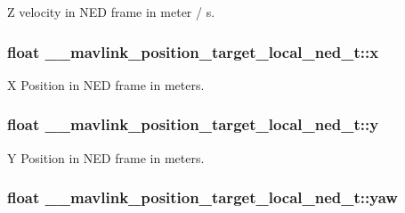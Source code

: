 Z velocity in N\+E\+D frame in meter / s. 

\hypertarget{struct____mavlink__position__target__local__ned__t_acd9e375486fbe3886526fa88fcb47c7c}{
\subsubsection[{x}]{\setlength{\rightskip}{0pt plus 5cm}float \+\_\+\+\_\+mavlink\+\_\+position\+\_\+target\+\_\+local\+\_\+ned\+\_\+t\+::x}}\label{struct____mavlink__position__target__local__ned__t_acd9e375486fbe3886526fa88fcb47c7c}


X Position in N\+E\+D frame in meters. 

\hypertarget{struct____mavlink__position__target__local__ned__t_a9e1cb7c9701232b58700d2548f03a64b}{
\subsubsection[{y}]{\setlength{\rightskip}{0pt plus 5cm}float \+\_\+\+\_\+mavlink\+\_\+position\+\_\+target\+\_\+local\+\_\+ned\+\_\+t\+::y}}\label{struct____mavlink__position__target__local__ned__t_a9e1cb7c9701232b58700d2548f03a64b}


Y Position in N\+E\+D frame in meters. 

\hypertarget{struct____mavlink__position__target__local__ned__t_adbb9606b0d2acbc414ac9f5b887ef2aa}{
\subsubsection[{yaw}]{\setlength{\rightskip}{0pt plus 5cm}float \+\_\+\+\_\+mavlink\+\_\+position\+\_\+target\+\_\+local\+\_\+ned\+\_\+t\+::yaw}}\label{struct____mavlink__position__target__local__ned__t_adbb9606b0d2acbc414ac9f5b887ef2aa}


